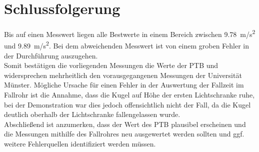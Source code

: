 \section{Schlussfolgerung}
Bis auf einen Messwert liegen alle Bestwerte in einem Bereich zwischen \SI{9,78}{m/s^2} und \SI{9,89}{m/s^2}. Bei dem abweichenden Messwert ist von einem groben Fehler in der Durchführung auszugehen.\\
Somit bestätigen die vorliegenden Messungen die Werte der PTB und widersprechen mehrheitlich den vorausgegangenen Messungen der Universität Münster. Mögliche Ursache für einen Fehler in der Auswertung der Fallzeit im Fallrohr ist die Annahme, dass die Kugel auf Höhe der ersten Lichtschranke ruhe, bei der Demonstration war dies jedoch offensichtlich nicht der Fall, da die Kugel deutlich oberhalb der Lichtschranke fallengelassen wurde.\\
Abschließend ist anzumerken, dass der Wert des PTB plausibel erscheinen und die Messungen mithilfe des Fallrohres neu ausgewertet werden sollten und ggf. weitere Fehlerquellen identifiziert werden müssen.